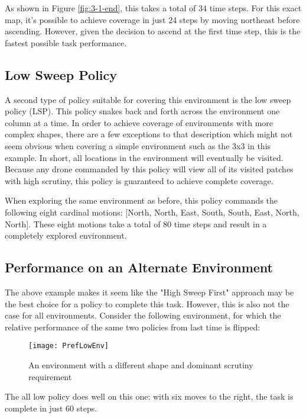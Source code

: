 As shown in Figure \ref{fig:3-1-end}, this takes a total of 34 time steps. For this exact map, it's possible to achieve coverage in just 24 steps by moving northeast before ascending. However, given the decision to ascend at the first time step, this is the fastest possible task performance.

\subsection{Low Sweep Policy}

A second type of policy suitable for covering this environment is the low sweep policy (LSP). This policy snakes back and forth across the environment one column at a time. In order to achieve coverage of environments with more complex shapes, there are a few exceptions to that description which might not seem obvious when covering a simple environment such as the 3x3 in this example. In short, all locations in the environment will eventually be visited. Because any drone commanded by this policy will view all of its visited patches with high scrutiny, this policy is guaranteed to achieve complete coverage.

When exploring the same environment as before, this policy commands the following eight cardinal motions: [North, North, East, South, South, East, North, North]. These eight motions take a total of 80 time steps and result in a completely explored environment.

\subsection{Performance on an Alternate Environment}

The above example makes it seem like the "High Sweep First" approach may be the best choice for a policy to complete this task. However, this is also not the case for all environments. Consider the following environment, for which the relative performance of the same two policies from last time is flipped:

\begin{figure}[H]
\texttt{[image: PrefLowEnv]}
\caption[Long Thin Environment]{An environment with a different shape and dominant scrutiny requirement}
\label{fig:3-2-env}
\end{figure}

The all low policy does well on this one: with six moves to the right, the task is complete in just 60 steps.

